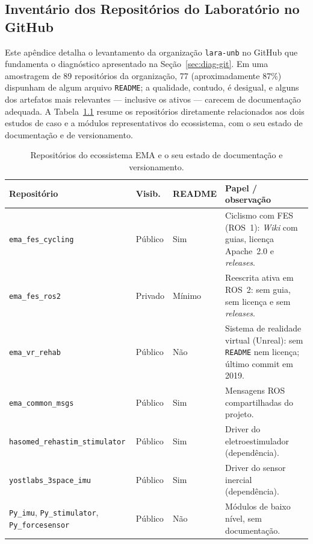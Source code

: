 \begin{apendicesenv}

\partapendices

\chapter{Inventário dos Repositórios do Laboratório no GitHub}
\label{ap:repos}

Este apêndice detalha o levantamento da organização \texttt{lara-unb} no GitHub que fundamenta
o diagnóstico apresentado na Seção~\ref{sec:diag-git}. Em uma amostragem de 89 repositórios da
organização, 77 (aproximadamente 87\%) dispunham de algum arquivo \texttt{README}; a qualidade,
contudo, é desigual, e alguns dos artefatos mais relevantes --- inclusive os ativos --- carecem
de documentação adequada. A Tabela~\ref{tab:repos} resume os repositórios diretamente
relacionados aos dois estudos de caso e a módulos representativos do ecossistema, com o seu
estado de documentação e de versionamento.

\begin{table}[H]
	\centering
	\caption{Repositórios do ecossistema EMA e o seu estado de documentação e versionamento.}
	\label{tab:repos}
	\scriptsize
	\begin{tabular}{p{4.4cm} p{1.4cm} p{1.5cm} p{5.0cm}}
		\hline
		\textbf{Repositório} & \textbf{Visib.} & \textbf{README} & \textbf{Papel / observação} \\
		\hline
		\texttt{ema\_fes\_cycling} & Público & Sim & Ciclismo com FES (ROS~1): \emph{Wiki} com guias, licença Apache~2.0 e \emph{releases}. \\
		\texttt{ema\_fes\_ros2} & Privado & Mínimo & Reescrita ativa em ROS~2: sem guia, sem licença e sem \emph{releases}. \\
		\texttt{ema\_vr\_rehab} & Público & Não & Sistema de realidade virtual (Unreal): sem \texttt{README} nem licença; último commit em 2019. \\
		\texttt{ema\_common\_msgs} & Público & Sim & Mensagens ROS compartilhadas do projeto. \\
		\texttt{hasomed\_rehastim\_stimulator} & Público & Sim & Driver do eletroestimulador (dependência). \\
		\texttt{yostlabs\_3space\_imu} & Público & Sim & Driver do sensor inercial (dependência). \\
		\texttt{Py\_imu}, \texttt{Py\_stimulator}, \texttt{Py\_forcesensor} & Público & Não & Módulos de baixo nível, sem documentação. \\
		\hline
	\end{tabular}


\end{table}
\end{apendicesenv}

